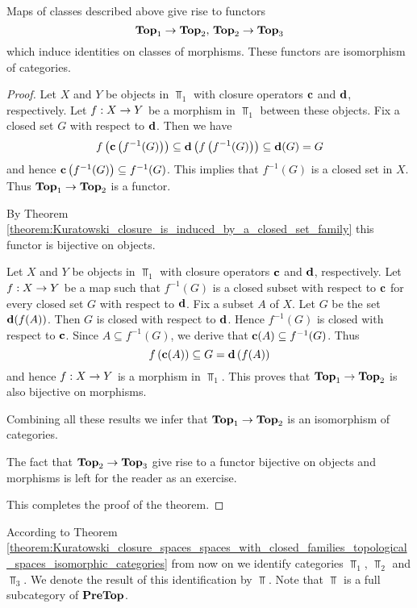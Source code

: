 \begin{theorem}\label{theorem:Kuratowski_closure_spaces_spaces_with_closed_families_topological_spaces_isomorphic_categories}
	Maps of classes described above give rise to functors
	$$\mathbf{Top}_1 \rightarrow \mathbf{Top}_2,\,\mathbf{Top}_2 \rightarrow \mathbf{Top}_3$$
	which induce identities on classes of morphisms. These functors are isomorphism of categories.
\end{theorem}
\begin{proof}
	Let $X$ and $Y$ be objects in $\Top_1$ with closure operators $\mathbf{c}$ and $\mathbf{d}$, respectively. Let $f:X\rightarrow Y$ be a morphism in $\Top_1$ between these objects. Fix a closed set $G$ with respect to $\mathbf{d}$. Then we have
	$$f\left(\mathbf{c}\left(f^{-1}(G)\right)\right) \subseteq \mathbf{d}\left(f\left(f^{-1}(G)\right)\right) \subseteq \mathbf{d}(G) = G$$
	and hence $\mathbf{c}\left(f^{-1}(G)\right) \subseteq f^{-1}(G)$. This implies that $f^{-1}(G)$ is a closed set in $X$. Thus $\mathbf{Top}_1 \rightarrow \mathbf{Top}_2$ is a functor.

	By Theorem \ref{theorem:Kuratowski_closure_is_induced_by_a_closed_set_family} this functor is bijective on objects.

	Let $X$ and $Y$ be objects in $\Top_1$ with closure operators $\mathbf{c}$ and $\mathbf{d}$, respectively. Let $f:X\rightarrow Y$ be a map such that $f^{-1}(G)$ is a closed subset with respect to $\mathbf{c}$ for every closed set $G$ with respect to $\mathbf{d}$. Fix a subset $A$ of $X$. Let $G$ be the set $\mathbf{d}(f(A))$. Then $G$ is closed with respect to $\mathbf{d}$. Hence $f^{-1}(G)$ is closed with respect to $\mathbf{c}$. Since $A \subseteq f^{-1}(G)$, we derive that $\mathbf{c}(A) \subseteq f^{-1}(G)$. Thus
	$$f\left(\mathbf{c}(A)\right) \subseteq G = \mathbf{d}\left(f(A)\right)$$
	and hence $f:X\rightarrow Y$ is a morphism in $\Top_1$. This proves that $\mathbf{Top}_1 \rightarrow \mathbf{Top}_2$ is also bijective on morphisms.

	Combining all these results we infer that $\mathbf{Top}_1 \rightarrow \mathbf{Top}_2$ is an isomorphism of categories.

	The fact that $\mathbf{Top}_2 \rightarrow \mathbf{Top}_3$ give rise to a functor bijective on objects and morphisms is left for the reader as an exercise.

	This completes the proof of the theorem.
\end{proof}
\noindent
According to Theorem \ref{theorem:Kuratowski_closure_spaces_spaces_with_closed_families_topological_spaces_isomorphic_categories} from now on we identify categories $\Top_1$, $\Top_2$ and $\Top_3$. We denote the result of this identification by $\Top$. Note that $\Top$ is a full subcategory of $\mathbf{PreTop}$.


